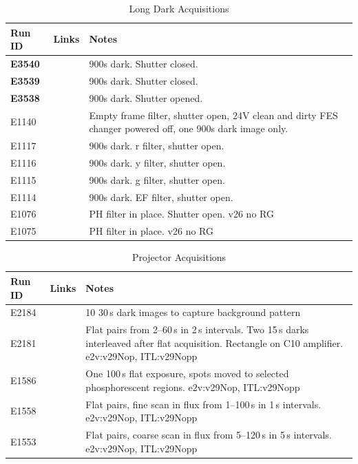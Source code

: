 \begin{table}[H]\label{table:runs_dark}
\centering
\caption{Long Dark Acquisitions}
\begin{tabular}{|p{1.5cm}|p{2.9cm}|p{9cm}|}
\hline
Run ID & Links & Notes \\ \hline
\textbf{E3540} & & 900s dark. Shutter closed. \\ \hline
\textbf{E3539} & & 900s dark. Shutter closed. \\ \hline
\textbf{E3538} & & 900s dark. Shutter opened. \\ \hline
E1140 & & Empty frame filter, shutter open, 24V clean and dirty FES changer powered off, one 900s dark image only.\\ \hline
E1117 & & 900s dark. r filter, shutter open.\\ \hline
E1116 & & 900s dark. y filter, shutter open.\\ \hline
E1115 & & 900s dark. g filter, shutter open.\\ \hline
E1114 & & 900s dark. EF filter, shutter open.\\ \hline
E1076 & & PH filter in place. Shutter open. v26 no RG\\ \hline
E1075 & & PH filter in place. v26 no RG\\ \hline
\end{tabular}
\end{table}

\begin{table}[H]\label{table:runs_projector}
\centering
\caption{Projector Acquisitions}
\begin{tabular}{|p{1.5cm}|p{2.9cm}|p{9cm}|}
\hline
Run ID & Links & Notes \\ \hline
E2184 & & 10 30\,s dark images to capture background pattern \\ \hline
E2181 & & Flat pairs from 2--60\,s in 2\,s intervals. Two 15\,s darks interleaved after flat acquisition. Rectangle on C10 amplifier. e2v:v29Nop, ITL:v29Nopp \\ \hline
E1586 & & One 100\,s flat exposure, spots moved to selected phosphorescent regions. e2v:v29Nop, ITL:v29Nopp \\ \hline
E1558 & & Flat pairs, fine scan in flux from 1--100\,s in 1\,s intervals. e2v:v29Nop, ITL:v29Nopp \\ \hline
E1553 & & Flat pairs, coarse scan in flux from 5--120\,s in 5\,s intervals. e2v:v29Nop, ITL:v29Nopp \\ \hline
\end{tabular}
\end{table}

